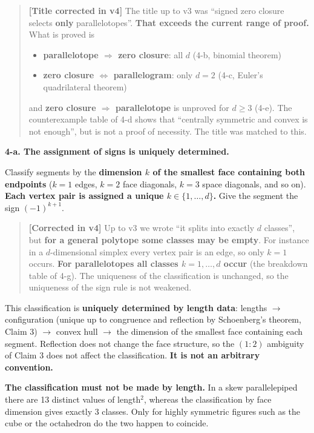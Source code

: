 \documentclass[
  10pt,
]{article}
\providecommand{\tightlist}{%
  \setlength{\itemsep}{0pt}\setlength{\parskip}{0pt}}
\begin{document}
\begin{quote}
\textbf{{[}Title corrected in v4{]}} The title up to v3 was ``signed
zero closure selects \textbf{only} parallelotopes''. \textbf{That
exceeds the current range of proof.} What is proved is

\begin{itemize}
\tightlist
\item
  \textbf{parallelotope \(\Rightarrow\) zero closure}: all \(d\) (4-b,
  binomial theorem)
\item
  \textbf{zero closure \(\Leftrightarrow\) parallelogram}: only \(d=2\)
  (4-c, Euler's quadrilateral theorem)
\end{itemize}

and \textbf{zero closure \(\Rightarrow\) parallelotope} is unproved for
\(d\ge3\) (4-e). The counterexample table of 4-d shows that ``centrally
symmetric and convex is not enough'', but is not a proof of necessity.
The title was matched to this.
\end{quote}

\textbf{4-a. The assignment of signs is uniquely determined.}

Classify segments by the \textbf{dimension \(k\) of the smallest face
containing both endpoints} (\(k = 1\) edges, \(k=2\) face diagonals,
\(k=3\) space diagonals, and so on). \textbf{Each vertex pair is
assigned a unique \(k \in \{1,\dots,d\}\).} Give the segment the sign
\((-1)^{k+1}\).

\begin{quote}
\textbf{{[}Corrected in v4{]}} Up to v3 we wrote ``it splits into
exactly \(d\) classes'', but \textbf{for a general polytope some classes
may be empty}. For instance in a \(d\)-dimensional simplex every vertex
pair is an edge, so only \(k=1\) occurs. \textbf{For parallelotopes all
classes \(k=1,\dots,d\) occur} (the breakdown table of 4-g). The
uniqueness of the classification is unchanged, so the uniqueness of the
sign rule is not weakened.
\end{quote}

This classification is \textbf{uniquely determined by length data}:
lengths \(\to\) configuration (unique up to congruence and reflection by
Schoenberg's theorem, Claim 3) \(\to\) convex hull \(\to\) the dimension
of the smallest face containing each segment. Reflection does not change
the face structure, so the \((1{:}2)\) ambiguity of Claim 3 does not
affect the classification. \textbf{It is not an arbitrary convention.}

\textbf{The classification must not be made by length.} In a skew
parallelepiped there are 13 distinct values of length\(^2\), whereas the
classification by face dimension gives exactly 3 classes. Only for
highly symmetric figures such as the cube or the octahedron do the two
happen to coincide.
\end{document}
